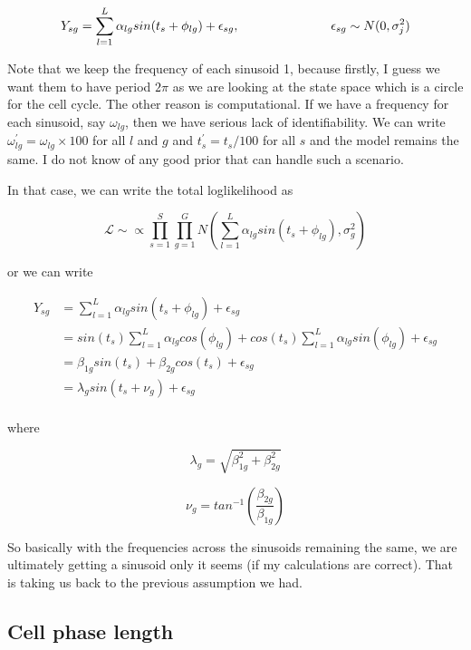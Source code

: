 \documentclass[11pt]{article}
\begin{document}
$$ Y_{sg} = \sum_{l=1}^{L} \alpha_{lg} sin (t_s + \phi_{lg})  +\epsilon_{sg}, \hspace{1 in}  \epsilon_{sg} \sim N(0, \sigma^2_j)  $$

Note that we keep the frequency of each sinusoid 1, because firstly, I guess we want them to have period $2 \pi$ as we are looking at the state space which is a circle for the cell cycle. The other reason is computational. If we have a frequency for each sinusoid, say $\omega_{lg}$, then we have serious lack of identifiability. We can write $\omega^{'}_{lg} = \omega_{lg} \times 100$ for all $l$ and $g$ and $t^{'}_s = t_s/100$ for all $s$ and the model remains the same. I do not know of any good prior that can handle such a scenario.

In that case, we can write the total loglikelihood as 

$$ \mathcal{L} \sim  \propto \prod_{s=1}^{S} \prod_{g=1}^{G} N ( \sum_{l=1}^{L}  \alpha_{lg} sin (t_s + \phi_{lg}), \sigma^2_{g} ) $$

or we can write 

\begin{align*}
Y_{sg}  & =  \sum_{l=1}^{L}  \alpha_{lg} sin (t_s + \phi_{lg}) + \epsilon_{sg}  \\
	    & = sin(t_s) \sum_{l=1}^{L} \alpha_{lg} cos(\phi_{lg}) + cos(t_s) \sum_{l=1}^{L} \alpha_{lg} sin(\phi_{lg}) + \epsilon_{sg}\\
	    & = \beta_{1g} sin(t_s) + \beta_{2g} cos(t_s)  + \epsilon_{sg}\\
	    & =  \lambda_g sin (t_s + \nu_g)  + \epsilon_{sg}\\
\end{align*}

where 

$$ \lambda_{g} = \sqrt{\beta^2_{1g} +  \beta^2_{2g}} $$

$$ \nu_g = tan^{-1}  \left (\frac{\beta_{2g}}{\beta_{1g}} \right ) $$   

So basically with the frequencies across the sinusoids remaining the same, we are ultimately getting a sinusoid only it seems (if my calculations are correct). That is taking us back to the previous assumption we had. 

\subsection{Cell phase length}
\end{document}
